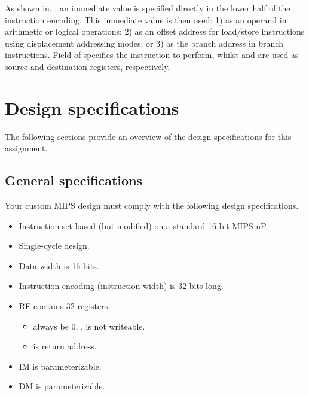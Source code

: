 \documentclass[number=03]{assignment}
\begin{document}
As shown in, , an immediate value is specified directly in the lower half of the \Itype instruction encoding. 
This immediate value is then used: 1) as an operand in arithmetic or logical operations; 2) as an offset address for load/store instructions using displacement addressing modes; or 3) as the branch address in branch instructions. 
Field  of  specifies the instruction to perform, whilst  and  are used as source and destination registers, respectively.


\section{Design specifications}
The following sections provide an overview of the design specifications for this assignment.

\subsection{General specifications}\label{sec:general_specs}
Your custom \ac{MIPS} design must comply with the following design specifications.
%
\begin{itemize}
\item Instruction set based (but modified) on a standard 16-bit \ac{MIPS} \ac{uP}.
\item Single-cycle design.
\item Data width is 16-bits.
\item Instruction encoding (instruction width) is 32-bits long.
\item \ac{RF} contains 32 registers.
\begin{itemize}
\item {}  always be 0, \ie,  is not writeable.
\item {} is return address.
\end{itemize}
\item \ac{IM} is parameterizable.
\item \ac{DM} is parameterizable.
\end{itemize}
%

\newpage
\end{document}
